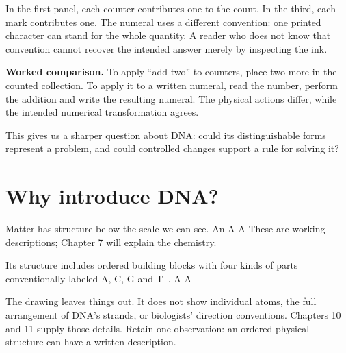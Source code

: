 In the first panel, each counter contributes one to the count. In the third, each mark contributes one. The numeral uses a different convention: one printed character can stand for the whole quantity. A reader who does not know that convention cannot recover the intended answer merely by inspecting the ink.

\textbf{Worked comparison.} To apply “add two” to counters, place two more in the counted collection. To apply it to a written numeral, read the number, perform the addition and write the resulting numeral. The physical actions differ, while the intended numerical transformation agrees.

This gives us a sharper question about DNA: could its distinguishable forms represent a problem, and could controlled changes support a rule for solving it?

\clearpage
\section{Why introduce DNA?}\label{sec:dna}
Matter has structure below the scale we can see. An  A  A  These are working descriptions; Chapter 7 will explain the chemistry.

 Its structure includes ordered building blocks with four kinds of parts conventionally labeled A, C, G and T~\cite{nhgri-dna}. A  A 

The drawing leaves things out. It does not show individual atoms, the full arrangement of DNA's strands, or biologists' direction conventions. Chapters 10 and 11 supply those details. Retain one observation: an ordered physical structure can have a written description.

